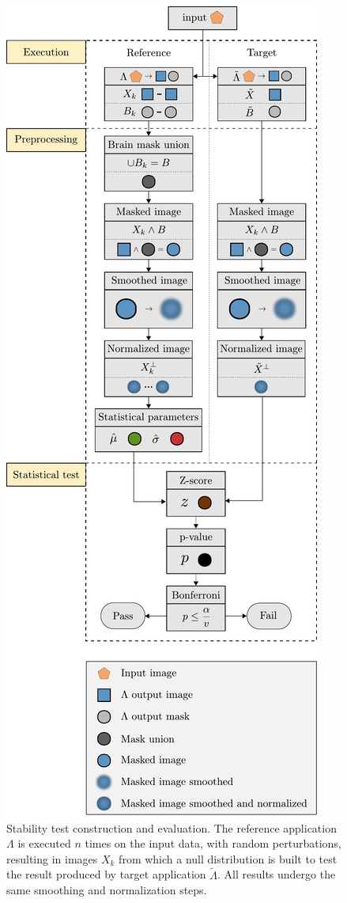 \documentclass[lettersize,journal]{IEEEtran}
\begin{document}
\begin{figure}
  \centering
  \includegraphics[width=\columnwidth]{figures/workflow_V.pdf}
  \caption{Stability test construction and evaluation. The reference application $\Lambda$ is executed $n$ times on the input data, with random perturbations, resulting in images $X_k$ from which a null distribution is built to test the result produced by target application $\tilde \Lambda$. All results undergo the same smoothing and normalization steps.}
  \label{fig:test_workflow}
\end{figure}
\end{document}
